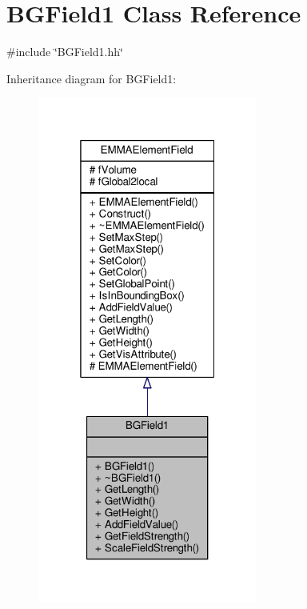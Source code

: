 \hypertarget{classBGField1}{}\section{B\+G\+Field1 Class Reference}
\label{classBGField1}


{\ttfamily \#include \char`\"{}B\+G\+Field1.\+hh\char`\"{}}



Inheritance diagram for B\+G\+Field1\+:
\nopagebreak
\begin{figure}[H]
\begin{center}
\leavevmode
\includegraphics[width=205pt]{classBGField1__inherit__graph}
\end{center}
\end{figure}


